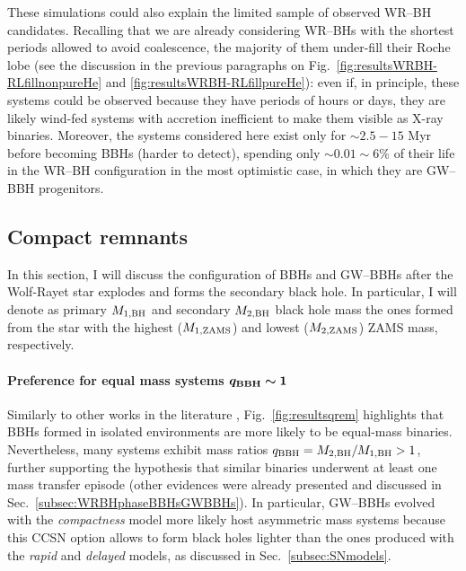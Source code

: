 \documentclass[a4paper,titlepage]{book}     	%
\begin{document}
These simulations could also explain the limited sample of observed WR--BH candidates. Recalling that we are already considering WR--BHs with the shortest periods allowed to avoid coalescence, the majority of them under-fill their Roche lobe (see the discussion in the previous paragraphs on Fig.\ \ref{fig:resultsWRBH-RLfillnonpureHe} and \ref{fig:resultsWRBH-RLfillpureHe}): even if, in principle, these systems could be observed because they have periods of hours or days, they are likely wind-fed systems with accretion inefficient to make them visible as X-ray binaries. Moreover, the systems considered here exist only for $\sim 2.5 - 15$ Myr before becoming BBHs (harder to detect), spending only $\sim 0.01 \sim 6\%$ of their life in the WR--BH configuration in the most optimistic case, in which they are GW--BBH progenitors.



\subsection{Compact remnants}\label{subsec:remnantsBBHsGWBBHs}
In this section, I will discuss the configuration of BBHs and GW--BBHs after the Wolf-Rayet star explodes and forms the secondary black hole. In particular, I will denote as primary $M_{\rm 1,BH}$ and secondary $M_{\rm 2,BH}$ black hole mass the ones formed from the star with the highest ($M_{\rm 1, ZAMS}$) and lowest ($M_{\rm 2, ZAMS}$) ZAMS mass, respectively.

\paragraph{Preference for equal mass systems $\boldsymbol{q_{\rm BBH} \sim 1}$}Similarly to other works in the literature \cite{giacobbomapelli2018_mobse_fryer}, Fig.\ \ref{fig:resultsqrem} highlights that BBHs formed in isolated environments are more likely to be equal-mass binaries. Nevertheless, many systems exhibit mass ratios $q_{\rm BBH}=M_{\rm 2, BH}/M_{\rm 1, BH} > 1$, further supporting the hypothesis that similar binaries underwent at least one mass transfer episode (other evidences were already presented and discussed in Sec.\ \ref{subsec:WRBHphaseBBHsGWBBHs}). In particular, GW--BBHs evolved with the \emph{compactness} model  more likely host  asymmetric mass systems because this CCSN option allows to form black holes lighter than the ones produced with the \emph{rapid} and \emph{delayed} models, as discussed in Sec.\ \ref{subsec:SNmodels}.
\end{document}
